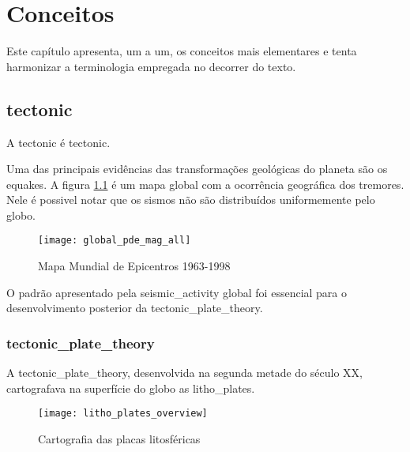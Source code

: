 \chapter{Conceitos}
\label{cap:conceitos}

Este capítulo apresenta, um a um, os conceitos mais elementares 
e tenta harmonizar a terminologia empregada no decorrer do texto.


\section{\Gls{tectonic}}
\label{sec:02_tectonica}

A \gls{tectonic} é \glsdesc*{tectonic}.

Uma das principais evidências das transformações geológicas do planeta 
são os \glspl{equake}. A figura \ref{f:global_epicenters} \citep{lowman_jr_1998}
é um mapa global com a ocorrência geográfica dos tremores. Nele é possivel notar que 
os sismos não são distribuídos uniformemente pelo globo.

\begin{figure}[H]
   \centering
   \texttt{[image: global\_pde\_mag\_all]}
   \caption[Mapa Mundial de Epicentros 1963-1998]
   		   {Mapa Mundial de Epicentros 1963-1998\footnotemark} 
   \label{f:global_epicenters}
\end{figure} 
 
O padrão apresentado pela \gls{seismic_activity} global foi essencial 
para o desenvolvimento posterior da \gls*{tectonic_plate_theory}.

\subsection{\Gls{tectonic_plate_theory}}
\label{sec:02_placas}

A \gls*{tectonic_plate_theory}, desenvolvida na segunda metade do século XX,
cartografava na superfície do globo as \glspl{litho_plate}.


\begin{figure}[H]
   \centering
   \texttt{[image: litho\_plates\_overview]}
   \caption[Cartografia das placas litosféricas]
   		   {Cartografia das placas litosféricas\footnotemark} 
   \label{f:plates_overview}
\end{figure} 
 

